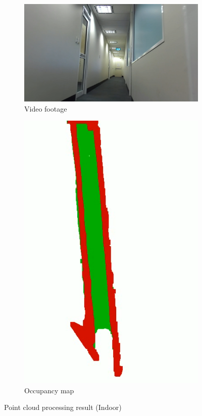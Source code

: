 \begin{figure}[H]
    \centering
    \begin{subfigure}{.64\textwidth}
        \centering
        \includegraphics[width=\linewidth]{images/pcloud_indoor_video.PNG}
        \caption{Video footage}
    \end{subfigure}
    \quad
    \begin{subfigure}{.24\textwidth}
        \centering
        \includegraphics[width=\linewidth]{images/pcloud_indoor.PNG}
        \caption{Occupancy map}
    \end{subfigure}
    \caption{Point cloud processing result (Indoor)}
    \label{fig:pcloud_indoor}
\end{figure}

